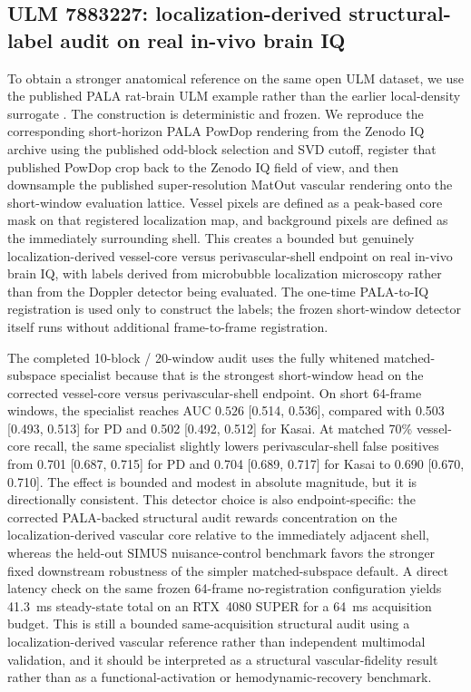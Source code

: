 \subsection{ULM 7883227: localization-derived structural-label audit on real in-vivo brain IQ}
To obtain a stronger anatomical reference on the same open ULM dataset, we use the published PALA rat-brain ULM example rather than the earlier local-density surrogate \cite{ChavignonZenodo7883227,HeilesULMBenchmark2021}. The construction is deterministic and frozen. We reproduce the corresponding short-horizon PALA PowDop rendering from the Zenodo IQ archive using the published odd-block selection and SVD cutoff, register that published PowDop crop back to the Zenodo IQ field of view, and then downsample the published super-resolution MatOut vascular rendering onto the short-window evaluation lattice. Vessel pixels are defined as a peak-based core mask on that registered localization map, and background pixels are defined as the immediately surrounding shell. This creates a bounded but genuinely localization-derived vessel-core versus perivascular-shell endpoint on real in-vivo brain IQ, with labels derived from microbubble localization microscopy rather than from the Doppler detector being evaluated. The one-time PALA-to-IQ registration is used only to construct the labels; the frozen short-window detector itself runs without additional frame-to-frame registration.

The completed 10-block / 20-window audit uses the fully whitened matched-subspace specialist because that is the strongest short-window head on the corrected vessel-core versus perivascular-shell endpoint. On short 64-frame windows, the specialist reaches AUC $0.526$ [0.514, 0.536], compared with 0.503 [0.493, 0.513] for PD and 0.502 [0.492, 0.512] for Kasai. At matched 70\% vessel-core recall, the same specialist slightly lowers perivascular-shell false positives from 0.701 [0.687, 0.715] for PD and 0.704 [0.689, 0.717] for Kasai to 0.690 [0.670, 0.710]. The effect is bounded and modest in absolute magnitude, but it is directionally consistent. This detector choice is also endpoint-specific: the corrected PALA-backed structural audit rewards concentration on the localization-derived vascular core relative to the immediately adjacent shell, whereas the held-out SIMUS nuisance-control benchmark favors the stronger fixed downstream robustness of the simpler matched-subspace default. A direct latency check on the same frozen 64-frame no-registration configuration yields 41.3~ms steady-state total on an RTX~4080 SUPER for a 64~ms acquisition budget. This is still a bounded same-acquisition structural audit using a localization-derived vascular reference rather than independent multimodal validation, and it should be interpreted as a structural vascular-fidelity result rather than as a functional-activation or hemodynamic-recovery benchmark.

